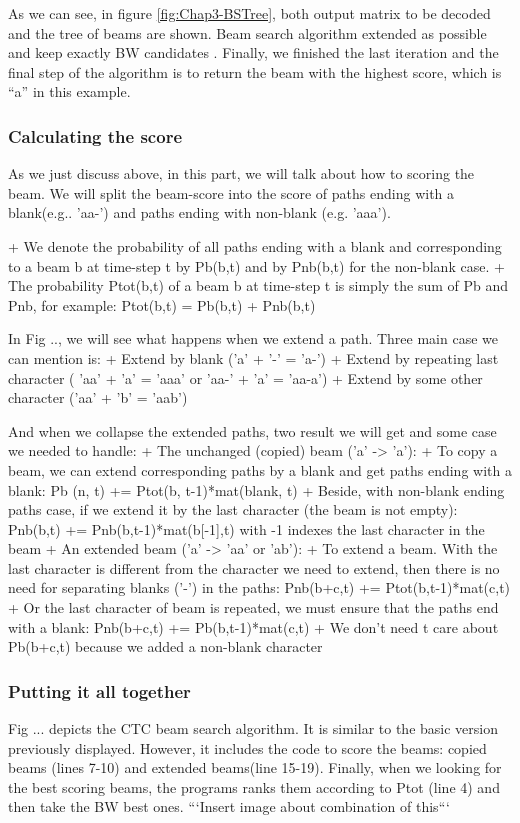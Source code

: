       As we can see, in figure \ref{fig:Chap3-BSTree}, both output matrix to be decoded and the tree of beams are shown. 
      Beam search algorithm extended as possible and keep exactly BW candidates . Finally,
      we finished the last iteration and the final step of the algorithm is to return the beam 
      with the highest score, which is “a” in this example.
      
      \subsubsection{ Calculating the score }
      As we just discuss above, in this part, we will talk about how to scoring the beam.
      We will split the beam-score into the score of paths ending with a blank(e.g.. 'aa-')
      and paths ending with non-blank (e.g. 'aaa'). 
      
      + We denote the probability of all paths ending with a blank and corresponding to a beam b at time-step t 
      by Pb(b,t) and by Pnb(b,t) for the non-blank case.
      + The probability Ptot(b,t) of a beam b at time-step t is simply the sum of Pb and Pnb, for example:
      Ptot(b,t) = Pb(b,t) + Pnb(b,t)

      In Fig .., we will see what happens when we extend a path. Three main case we can mention
      is: 
        + Extend by blank ('a' + '-' = 'a-')
        + Extend by repeating last character ( 'aa' + 'a' = 'aaa' or 'aa-' + 'a' = 'aa-a')
        + Extend by some other character ('aa' + 'b' = 'aab')
      
      And when we collapse the extended paths, two result we will get and some case we needed to handle:
        + The unchanged (copied) beam ('a' -> 'a'):
          + To copy a beam, we can extend corresponding paths by a blank and get
          paths ending with a blank: Pb (n, t) += Ptot(b, t-1)*mat(blank, t)
          + Beside, with non-blank ending paths case, if we extend it by the last
          character (the beam is not empty): Pnb(b,t) += Pnb(b,t-1)*mat(b[-1],t)
          with -1 indexes the last character in the beam
        + An extended beam ('a' -> 'aa' or 'ab'):
          + To extend a beam. With the last character is different from the character we need
          to extend, then there is no need for separating blanks ('-') in the paths:
            Pnb(b+c,t) += Ptot(b,t-1)*mat(c,t)
          + Or the last character of beam is repeated, we must ensure that the paths
          end with a blank: Pnb(b+c,t) += Pb(b,t-1)*mat(c,t)
          + We don't need t care about Pb(b+c,t) because we added a non-blank character
      \subsubsection{ Putting it all together }
        Fig ... depicts the CTC beam search algorithm. It is similar to the basic version
        previously displayed. However, it includes the code to score the beams: copied beams
        (lines 7-10) and extended beams(line 15-19). Finally, when we looking for the best scoring
        beams, the programs ranks them according to Ptot (line 4) and then take the BW best ones.
        ```Insert image about combination of this```
      

